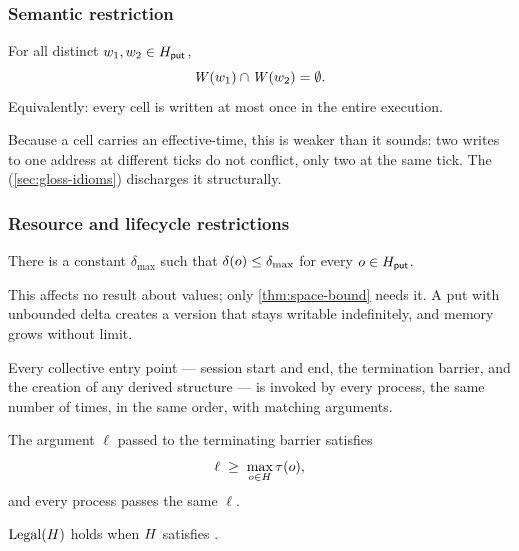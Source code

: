 \subsubsection*{Semantic restriction}

\begin{restr}\label{res:write-disjoint}
For all distinct $w_1, w_2 \in H_{\mathsf{put}}$,
\[
  \mathit{W}(w_1) \cap \mathit{W}(w_2) = \emptyset .
\]
Equivalently: every cell is written at most once in the entire execution.
\end{restr}

Because a \gls{cell} carries an \gls{effective-time}, this is weaker than it
sounds: two writes to one address at different ticks do not conflict, only two
at the same tick. The 
(\cref{sec:gloss-idioms}) discharges it structurally.

\subsubsection*{Resource and lifecycle restrictions}

\begin{restr}\label{res:horizon}
There is a constant $\delta_{\max}$ such that $\delta(o) \le \delta_{\max}$
for every $o \in H_{\mathsf{put}}$.
\end{restr}

This affects no result about values; only \cref{thm:space-bound} needs it. A
put with unbounded \gls{delta} creates a version that stays writable
indefinitely, and memory grows without limit.

\begin{restr}\label{res:collective}
Every collective entry point --- session start and end, the \gls{termination}
\gls{barrier}, and the creation of any derived structure --- is invoked by every
process, the same number of times, in the same order, with matching arguments.
\end{restr}

\begin{restr}\label{res:terminate}
The argument $\ell$ passed to the terminating barrier satisfies
\[
  \ell \;\ge\; \max_{o \in H} \tau(o),
\]
and every process passes the same $\ell$. 
\end{restr}

\begin{definition}[Legality]\label{def:legal}
$\mathrm{Legal}(H)$ holds when $H$ satisfies
.
\end{definition}

